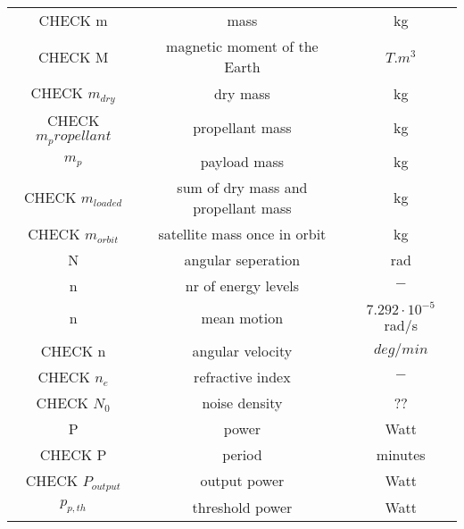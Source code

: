 \documentclass[11pt]{report}
\begin{document}
\begin{center}
\begin{longtable}{c|c|c}
CHECK m 																	& mass 																				& kg \\

CHECK M                                    & magnetic moment of the Earth                 & $T.m^3$ \\

CHECK $m_{dry}$                           & dry mass                                    & kg \\

CHECK $m_propellant$								    	& propellant mass 														& kg \\

$m_p$ 															& payload mass 																& kg \\

CHECK $m_{loaded}$												& sum of dry mass and propellant mass					& kg \\

CHECK $m_{orbit}$                         & satellite mass once in orbit                & kg \\

N 																	& angular seperation 													& rad \\

n 																	& nr of energy levels 												& $-$ \\

n 																	& mean motion 																& $7.292\cdot 10^{ - 5}$ rad/s \\

CHECK n                                & angular velocity                             & $deg/{min}$ \\

CHECK $n_e$ 															& refractive index 														& $-$ \\

CHECK $N_0$                            & noise density                                & ?? \\

P 																	& power 																			& Watt \\

CHECK P                             & period                                      & minutes \\

CHECK $P_{output}$                       & output power                             & Watt \\

$p_{p,th}$ 													& threshold power 														& Watt \\


\end{longtable}
\end{center}
\end{document}
